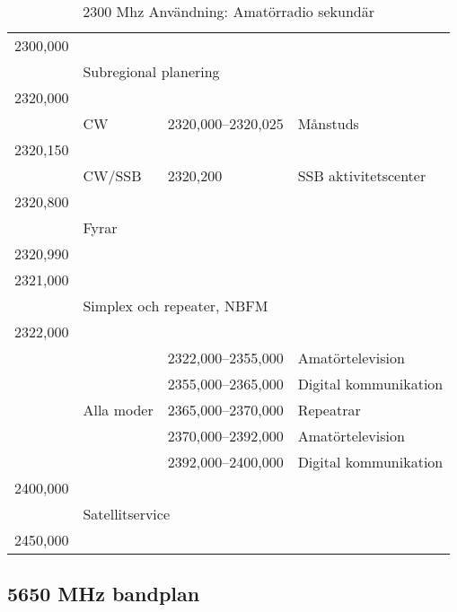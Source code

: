\setlongtables
\begin{longtable}{llll}
\caption{2300 Mhz Användning: Amatörradio sekundär} \\

2300,000 & & & \\
         & \multicolumn{3}{l}{Subregional planering} \\
2320,000 & & & \\
         & CW     & 2320,000--2320,025 & Månstuds \\
2320,150 & & & \\
         & CW/SSB & 2320,200            & SSB aktivitetscenter \\
2320,800 & & & \\
         & Fyrar & & \\
2320,990 & & & \\
2321,000 & & & \\
         & \multicolumn{3}{l}{Simplex och repeater, NBFM} \\
2322,000 & & & \\
         &            & 2322,000--2355,000 & Amatörtelevision \\
         &            & 2355,000--2365,000 & Digital kommunikation \\
         & Alla moder & 2365,000--2370,000 & Repeatrar \\
         &            & 2370,000--2392,000 & Amatörtelevision \\
         &            & 2392,000--2400,000 & Digital kommunikation \\
2400,000 & & & \\
         & \multicolumn{3}{l}{Satellitservice} \\
2450,000 & & & \\
\end{longtable}

\subsection{5650 MHz bandplan}

